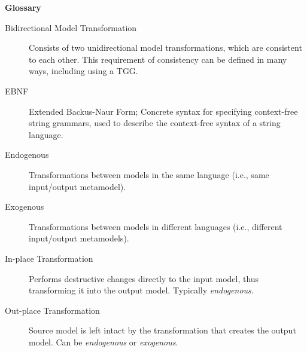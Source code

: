 \newpage
{}
{}
\hypertarget{glossary}{}

\vspace{1cm}
{\Huge \bf Glossary}
\vspace{1cm}


\begin{description}

\item[Bidirectional Model Transformation]  Consists of two unidirectional model transformations, which are consistent to each other. This requirement of
consistency can be defined in many ways, including using a TGG.

\item[EBNF] Extended Backus-Naur Form; Concrete syntax for specifying context-free string grammars, used to describe the context-free syntax of a
string language.

\item[Endogenous] Transformations between models in the same language (i.e., same input/output metamodel). 
 
\item[Exogenous] Transformations between models in different languages (i.e., different input/output metamodels). 

\item[In-place Transformation] Performs destructive changes directly to the input model, thus transforming it into the output model. Typically
\emph{endogenous}.

\item[Out-place Transformation] Source model is left intact by the transformation that creates the output model. Can be \emph{endogenous} or \emph{exogenous}.

\end{description}

